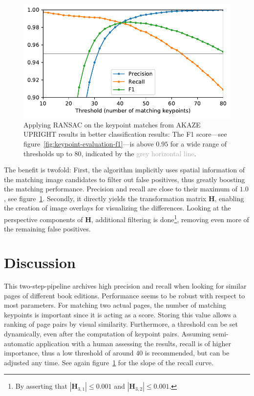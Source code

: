 \documentclass{ltjarticle}
\begin{document}
\begin{figure}
    \centering
    \includegraphics[width=\textwidth]{ransac_performance}
    \caption[RANSAC performance]{Applying RANSAC on the keypoint matches from AKAZE UPRIGHT results in better classification results: The \textcolor{mplgreen}{F1 score}---see figure~\ref{fig:keypoint-evaluation-f1}---is above $0.95$ for a wide range of thresholds up to $80$, indicated by the \textcolor{darkgray}{grey horizontal line}.}
    \label{fig:ransac}
\end{figure}

The benefit is twofold: First, the algorithm implicitly uses spatial information of the matching image candidates to filter out false positives, thus greatly boosting the matching performance. Precision and recall are close to their maximum of $1.0$, see figure~\ref{fig:ransac}. Secondly, it directly yields the transformation matrix $\mathbf{H}$, enabling the creation of image overlays for visualizing the differences. Looking at the perspective components of $\mathbf{H}$, additional filtering is done\footnote{By asserting that $|\mathbf{H}_{3,1}| \leq 0.001$ and $|\mathbf{H}_{3,2}| \leq 0.001$.}, removing even more of the remaining false positives.

\section{Discussion}

This two-step-pipeline archives high precision and recall when looking for similar pages of different book editions. Performance seems to be robust with respect to most parameters. For matching two actual pages, the number of matching keypoints is important since it is acting as a score. Storing this value allows a ranking of page pairs by visual similarity. Furthermore, a threshold can be set dynamically, even after the computation of keypoint pairs. Assuming semi-automatic application with a human assessing the results, recall is of higher importance, thus a low threshold of around $40$ is recommended, but can be adjusted any time. See again figure~\ref{fig:ransac} for the slope of the recall curve.
\end{document}
